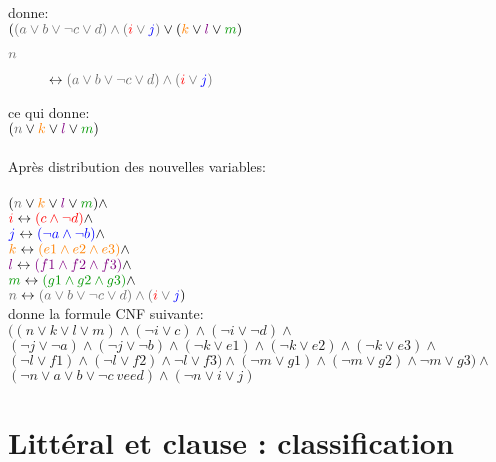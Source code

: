 donne:\\
$(\cgris{(a \vee b \vee \neg c \vee d) \wedge (\crouge{i} \vee \cblue{j})} \vee (\corange{k} \vee \cviolet{l}\vee \cvert{m})$\\

\begin{description}
\item[$\cgris{n}$] $\leftrightarrow \cgris{(a \vee b \vee \neg c \vee d) \wedge (\crouge{i} \vee \cblue{j})}$
\end{description}

ce qui donne:\\
$(\cgris{n} \vee \corange{k} \vee \cviolet{l}\vee \cvert{m})$\\

\pagebreak
\ \\
Après distribution des nouvelles variables:\\
\ \\
$(\cgris{n} \vee \corange{k} \vee \cviolet{l}\vee \cvert{m}) \wedge $\\
$\textcolor{red}{i} \leftrightarrow \textcolor{red}{(c \wedge \neg d)} \wedge $\\ 
$\textcolor{blue}{j} \leftrightarrow \textcolor{blue}{(\neg a \wedge \neg b)} \wedge $\\
$\textcolor{orange}{k} \leftrightarrow \textcolor{orange}{(e1 \wedge e2 \wedge e3)} \wedge $\\
$\textcolor{violet}{l} \leftrightarrow \textcolor{violet}{(f1 \wedge f2 \wedge f3)} \wedge $\\
$\cvert{m} \leftrightarrow \cvert{(g1 \wedge g2 \wedge g3)} \wedge $\\
$\cgris{n} \leftrightarrow \cgris{(a \vee b \vee \neg c \vee d) \wedge (\crouge{i} \vee \cblue{j}})$
\\

donne la formule CNF suivante:\\
$((n \vee k \vee l \vee m)\wedge (\neg i \vee c)\wedge (\neg i \vee \neg d)\wedge$\\
$(\neg j \vee \neg a)\wedge(\neg j \vee \neg b)\wedge(\neg k \vee e1)\wedge(\neg k \vee e2)\wedge(\neg k \vee e3)\wedge$\\
$(\neg l \vee f1)\wedge(\neg l \vee f2)\wedge\neg l \vee f3)\wedge(\neg m \vee g1)\wedge(\neg m \vee g2)\wedge\neg m \vee g3)\wedge$\\
$(\neg n \vee a \vee b \vee \neg c \ vee d)\wedge(\neg n \vee i \vee j)$\\

\section{Littéral et clause : classification}

